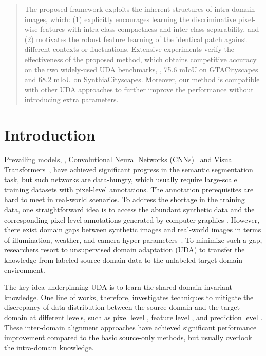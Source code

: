 \documentclass[10pt,twocolumn,letterpaper]{article}
\begin{document}
\begin{abstract}
\begin{figure}[]
  \vspace{-1em}
  \label{fig1}
\end{figure}
The proposed framework exploits the inherent structures of intra-domain images, which: (1) explicitly encourages learning the  discriminative pixel-wise features with intra-class compactness and inter-class separability, and (2) motivates the robust feature learning of the identical patch against different contexts or fluctuations.
   Extensive experiments verify the effectiveness of the proposed method, which obtains competitive accuracy on the two widely-used UDA benchmarks, \ie, 75.6 mIoU on GTACityscapes and 68.2 mIoU on SynthiaCityscapes. Moreover, our method is compatible with other UDA approaches to further improve the performance without introducing extra parameters. 

\end{abstract}

\section{Introduction}




Prevailing models, \eg, Convolutional Neural Networks (CNNs)~\cite{long2015fully, chen2017deeplab} and Visual Transformers~\cite{zheng2021rethinking, liu2021swin}, have achieved significant progress in the semantic segmentation task, but such networks are data-hungry, which usually require large-scale training datasets with pixel-level annotations. The annotation prerequisites are hard to meet in  real-world scenarios. 
To address the shortage in the training data, one straightforward idea is to 
access the abundant synthetic data and the corresponding pixel-level annotations generated by computer graphics \cite{StephanRRichter2016PlayingFD, GermanRos2016TheSD}. However, there exist domain gaps between synthetic images and real-world images in terms of
illumination, weather, and camera hyper-parameters~\cite{ZuxuanWu2019ACEAT,wang2022multiple,fang2022behavioral}. 
To minimize such a gap, researchers resort to unsupervised domain adaptation (UDA) to transfer the knowledge from labeled source-domain data to the unlabeled target-domain environment. 

The key idea underpinning UDA is to learn the shared domain-invariant knowledge. 
One line of works, therefore, investigates techniques to mitigate the discrepancy of data distribution between the source domain and the target domain at different levels, such as pixel level \cite{hoffman2018cycada, li2019bidirectional,yang2020fda, ZuxuanWu2019ACEAT}, feature level \cite{luo2019significance,huang2018domain}, and prediction level \cite{tsai2018learning, tsai2019domain, FeiPan2020UnsupervisedIA,vu2019advent}. 
These inter-domain alignment approaches have 
achieved significant performance improvement compared to the basic source-only methods, but usually overlook the intra-domain knowledge. 
\end{document}
